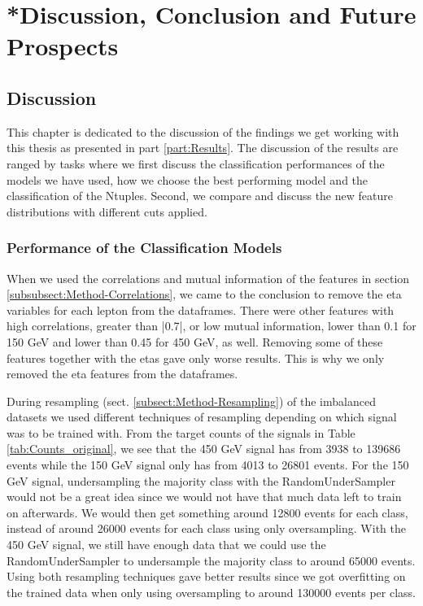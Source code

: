 \documentclass[a4paper, american, 12pt]{report}
\begin{document}
	\part{*Discussion, Conclusion and Future Prospects}
	\label{part:Conclusion}
	
	\chapter{Discussion}  %
	\label{chap:Discussion}
	This chapter is dedicated to the discussion of the findings we get working with this thesis as presented in part \ref{part:Results}. The discussion of the results are ranged by tasks where we first discuss the classification performances of the models we have used, how we choose the best performing model and the classification of the Ntuples. Second, we compare and discuss the new feature distributions with different cuts applied.
	
	
	\section{Performance of the Classification Models}
	\label{sect:Discussion-PerformanceEval}	
	When we used the correlations and mutual information of the features in section \ref{subsubsect:Method-Correlations}, we came to the conclusion to remove the eta variables for each lepton from the dataframes. There were other features with high correlations, greater than |0.7|, or low mutual information, lower than 0.1 for 150 GeV and lower than 0.45 for 450 GeV, as well. Removing some of these features together with the etas gave only worse results. This is why we only removed the eta features from the dataframes.
	
	During resampling (sect. \ref{subsect:Method-Resampling}) of the imbalanced datasets we used different techniques of resampling depending on which signal was to be trained with. From the target counts of the signals in Table \ref{tab:Counts_original}, we see that the 450 GeV signal has from 3938 to 139686 events while the 150 GeV signal only has from 4013 to 26801 events. For the 150 GeV signal, undersampling the majority class with the RandomUnderSampler would not be a great idea since we would not have that much data left to train on afterwards. We would then get something around 12800 events for each class, instead of around 26000 events for each class using only oversampling. With the 450 GeV signal, we still have enough data that we could use the RandomUnderSampler to undersample the majority class to around 65000 events. Using both resampling techniques gave better results since we got overfitting on the trained data when only using oversampling to around 130000 events per class.
	
\end{document}
